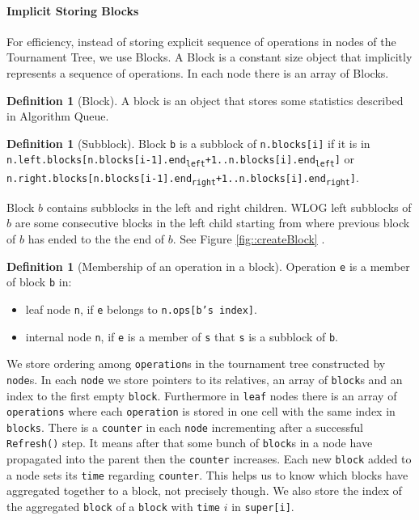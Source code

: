 \documentclass[10pt]{article}
\theoremstyle{definition}
\newtheorem{definition}[theorem]{Definition}
\begin{document}
\paragraph{Implicit Storing Blocks}
For efficiency, instead of storing explicit sequence of operations in nodes of the Tournament Tree, we use Blocks. A Block is a constant size object that implicitly represents a sequence of operations. In each node there is an array of Blocks.

\begin{definition}[Block]
A block is an object that stores some statistics described in Algorithm Queue.   
\end{definition}

\begin{definition}[\label{def::subblock}Subblock]
Block \texttt{b} is a subblock of \texttt{n.blocks[i]} if it is in \texttt{n.left.blocks[n.blocks[i-1].end\textsubscript{left}+1..n.blocks[i].end\textsubscript{left}]} or \texttt{n.right.blocks[n.blocks[i-1].end\textsubscript{right}+1..n.blocks[i].end\textsubscript{right}]}.
\end{definition}
Block $b$ contains subblocks in the left and right children. WLOG left subblocks of $b$ are some consecutive blocks in the left child starting from where previous block of $b$ has ended to the the end of $b$. See Figure \ref{fig::createBlock} .


\begin{definition}[Membership of an operation in a block]
Operation \texttt{e} is a member of block \texttt{b} in:
\begin{itemize}
 \item leaf node \texttt{n}, if \texttt{e} belongs to \texttt{n.ops[b's index]}.
 \item internal node \texttt{n}, if \texttt{e} is a member of \texttt{s} that \texttt{s} is a subblock of \texttt{b}.
\end{itemize}
  
\end{definition}

We store ordering among \texttt{operation}s in the tournament tree constructed by \texttt{node}s. In each \texttt{node} we store pointers to its relatives, an array of \texttt{block}s and an index to the first empty \texttt{block}. Furthermore in \texttt{leaf} nodes there is an array of \texttt{operations} where each \texttt{operation} is stored in one cell with the same index in \texttt{blocks}. There is a \texttt{counter} in each \texttt{node} incrementing after a successful \texttt{Refresh()} step. It means after that some bunch of \texttt{block}s in a node have propagated into the parent then the \texttt{counter} increases. Each new \texttt{block} added to a node sets its \texttt{time} regarding \texttt{counter}. This helps us to know which blocks have aggregated together to a block, not precisely though. We also store the index of the aggregated \texttt{block} of a \texttt{block} with \texttt{time} $i$ in \texttt{super[i]}. 
\end{document}
